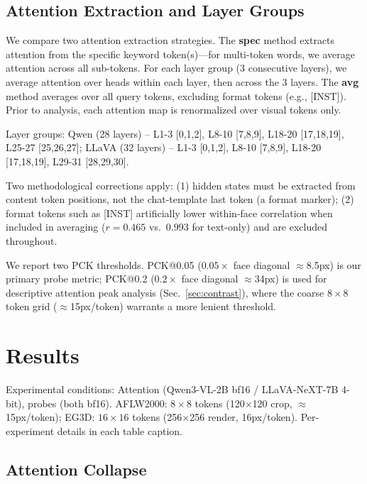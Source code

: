 \documentclass[10pt,twocolumn,letterpaper]{article}
\begin{document}
\subsection{Attention Extraction and Layer Groups}

We compare two attention extraction strategies. The \textbf{spec} method extracts attention from the specific keyword token(s)---for multi-token words, we average attention across all sub-tokens. For each layer group (3 consecutive layers), we average attention over heads within each layer, then across the 3 layers. The \textbf{avg} method averages over all query tokens, excluding format tokens (e.g., [INST]). Prior to analysis, each attention map is renormalized over visual tokens only.

Layer groups: Qwen (28 layers) -- L1-3 [0,1,2], L8-10 [7,8,9], L18-20 [17,18,19], L25-27 [25,26,27]; LLaVA (32 layers) -- L1-3 [0,1,2], L8-10 [7,8,9], L18-20 [17,18,19], L29-31 [28,29,30].

Two methodological corrections apply: (1) hidden states must be extracted from content token positions, not the chat-template last token (a format marker); (2) format tokens such as [INST] artificially lower within-face correlation when included in averaging ($r=0.465$ vs.\ $0.993$ for text-only) and are excluded throughout.

We report two PCK thresholds. PCK@0.05 ($0.05\times$ face diagonal $\approx$8.5px) is our primary probe metric; PCK@0.2 ($0.2\times$ face diagonal $\approx$34px) is used for descriptive attention peak analysis (Sec.~\ref{sec:contrast}), where the coarse $8\times8$ token grid ($\approx$15px/token) warrants a more lenient threshold.

\section{Results}
\label{sec:results}

Experimental conditions: Attention (Qwen3-VL-2B bf16 / LLaVA-NeXT-7B 4-bit), probes (both bf16). AFLW2000: $8\times8$ tokens (120$\times$120 crop, $\approx$15px/token); EG3D: $16\times16$ tokens (256$\times$256 render, 16px/token). Per-experiment details in each table caption.

\subsection{Attention Collapse}
\label{sec:collapse}
\end{document}
